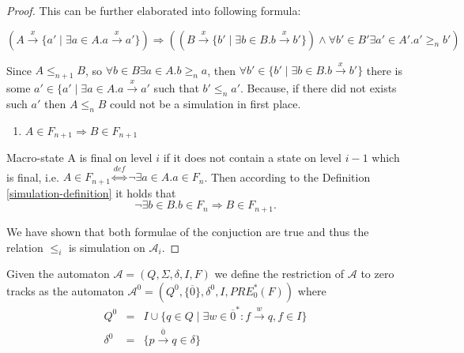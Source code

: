 \begin{proof}
 This can be further elaborated into following formula:
 
 \begin{equation}
 (A \overset{x}{\rightarrow} \{a' \mid \exists a \in A. a
 \overset{x}{\rightarrow} a'\}) \Rightarrow ( (B \overset{x}{\rightarrow}
 \{b' \mid \exists b \in B. b \overset{x}{\rightarrow} b'\}) \wedge \forall b'
 \in B' \exists a' \in A'. a' \geq_n b')
 \end{equation}
 
 Since $A \leq_{n+1} B$, so $\forall b \in B \exists a \in A. b \geq_n a$, then
 $\forall b' \in \{b' \mid \exists b \in B. b \overset{x}{\rightarrow} b'\}$
 there is some $a' \in \{a' \mid \exists a \in A. a \overset{x}{\rightarrow} a'$
 such that $b' \leq_n a'$. Because, if there did not exists such $a'$ then $A
 \leq_n B$ could not be a simulation in first place.
 
 \begin{enumerate}
   \item $A \in F_{n+1} \Rightarrow B \in F_{n+1}$
 \end{enumerate}
 Macro-state A is final on level $i$ if it does not contain a state on level
 $i-1$ which is final, i.e. $A \in F_{n+1}
 \overset{\mathit{def}}{\Leftrightarrow} \neg\exists a \in A. a \in F_n$. Then
 according to the Definition \ref{simulation-definition} it holds that
 \begin{equation}
  \neg\exists b \in B. b \in F_n \Rightarrow B \in F_{n+1}.
 \end{equation}
 
 We have shown that both formulae of the conjuction are true and thus the
 relation $\leq_i$ is simulation on $\mathcal{A}_i$.
 
\end{proof}

% 

\begin{defz}
Given the automaton $\mathcal{A} = (Q, \Sigma, \delta, I, F)$ we define the
restriction of $\mathcal{A}$ to zero tracks as
the automaton $\mathcal{A}^0 = (Q^0, \{\overline{0}\}, \delta^0, I, PRE_0^*(F))$
where
\begin{eqnarray}
 Q^0 & = & I \cup \{q \in Q \mid \exists w \in \overline{0}^*: f
 \overset{w}{\longrightarrow} q, f \in I\}\\
 \delta^0 & = & \{p \overset{\overline{0}}{\longrightarrow} q \in \delta\}
\end{eqnarray}
\end{defz}

